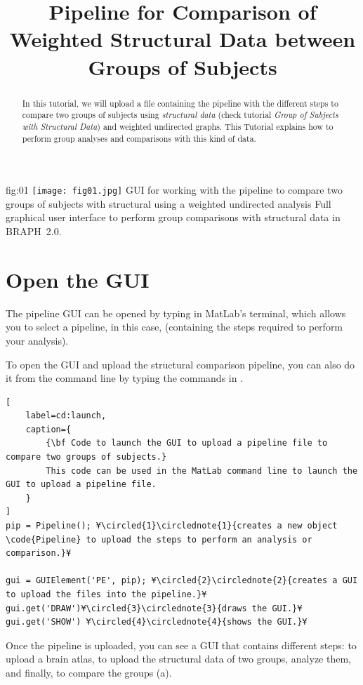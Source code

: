 \documentclass[justified]{tufte-handout}
\title{Pipeline for Comparison of Weighted Structural Data between Groups of Subjects}
\begin{document}
\maketitle

\begin{abstract}
\noindent
In this tutorial, we will upload a file containing the pipeline with the different steps to compare two groups of subjects using \emph{structural data} (check tutorial \emph{Group of Subjects with Structural Data}) and weighted undirected graphs. This Tutorial explains how to perform group analyses and comparisons with this kind of data.
\end{abstract}

\tableofcontents

	{fig:01}
	{\texttt{[image: fig01.jpg]}}
	{GUI for working with the pipeline to compare two groups of subjects with structural using a weighted undirected analysis}
	{
	Full graphical user interface to perform group comparisons with structural data in BRAPH~2.0. 
	}

\clearpage
\section{Open the GUI}

The pipeline GUI can be opened by typing  in MatLab's terminal, which allows you to select a pipeline, in this case,  (containing the steps required to perform your analysis).

To open the GUI and upload the structural comparison pipeline, you can also do it from the command line by typing the commands in .
%
\begin{lstlisting}[
	label=cd:launch,
	caption={
		{\bf Code to launch the GUI to upload a pipeline file to compare two groups of subjects.}
		This code can be used in the MatLab command line to launch the GUI to upload a pipeline file.
	}
]
pip = Pipeline(); ¥\circled{1}\circlednote{1}{creates a new object \code{Pipeline} to upload the steps to perform an analysis or comparison.}¥

gui = GUIElement('PE', pip); ¥\circled{2}\circlednote{2}{creates a GUI to upload the files into the pipeline.}¥
gui.get('DRAW')¥\circled{3}\circlednote{3}{draws the GUI.}¥
gui.get('SHOW') ¥\circled{4}\circlednote{4}{shows the GUI.}¥
\end{lstlisting}

Once the pipeline is uploaded, you can see a GUI that contains different steps: to upload a brain atlas, to upload the structural data of two groups, analyze them, and finally, to compare the groups (a). 
\end{document}
